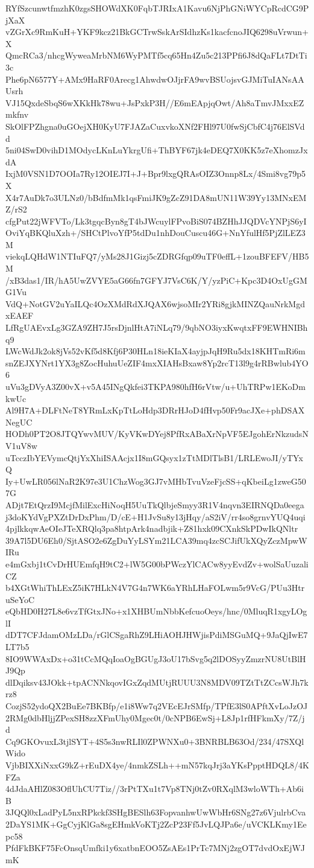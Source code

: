 RYfSzcunwtfmzhK0zgsSHOWdXK0FqbTJRIxA1Kavu6NjPhGNiWYCpRcdCG9PjXaX
vZGrXc9RmKuH+YKF9kcz21BkGCTrwSskArSIdhzKs1kacfcnoJIQ6298uVrwun+X
QmcRCa3/nhcgWyweaMrbNM6WyPMTf5cq65Hn4Zu5c213PPfi6J8dQaFLt7DtTi3c
Phe6pN6577Y+AMx9HaRF0Arecg1AhwdwOJjrFA9wvBSUojsvGJMiTuIANsAAUsrh
VJ15QxdeSbqS6wXKkHk78wu+JsPxkP3H//E6mEApjqOwt/Ah8aTmvJMxxEZmkfnv
SkOlFPZhgna0uGOejXH0KyU7FJAZaCuxvkoXNf2FHl97U0fwSjCbfC4j76ElSVdd
5ni04SwD0vihD1MOdycLKnLuYkrgUfi+ThBYF67jk4eDEQ7X0KK5z7eXhomzJxdA
IxjM0VSN1D7OOIa7Ry12OIEJ7I+J+Bpr9lxgQRAsOIZ3Onnp8Lx/4Smi8vg79p5X
X4r7AuDk7o3ULNz0/bBdfmMk1qsFmiJK9gZcZ91DA8mUN11W39Yy13MNxEMZ/rS2
cfgPut22jWFVTo/Lk3tgqcByn8gT4bJWcuylFPvoBiS074BZHhJJQDVcYNPjS6yI
OviYqBKQluXzh+/SHCtPlvoYfP5tdDu1nhDouCuscu46G+NnYfulHf5PjZlLEZ3M
viekqLQHdW1NTIuFQ7/yMs28J1Gizj5cZDRGfqp09uTF0effL+1zouBFEFV/HB5M
/xB3das1/IR/hA5UwZVYE5aG66fn7GFYJ7VsC6K/Y/yzPiC+Kpc3D4OxUgGMG1Vu
VdQ+NotGV2uYaILQc4OzXMdRdXJQAX6wjsoMIr2YRi8gjkMINZQauNrkMgdxEAEF
LfRgUAEvxLg3GZA9ZH7J5rsDjnlHtA7iNLq79/9qbNO3iyxKwqtxFF9EWHNIBhq9
LWcWdJk2ok8jVs52vKf5d8Kfj6P30HLn18ieKIaX4ayjpJqH9Ru5dx18KHTmRi6m
snZEJXYNrt1YX3g8ZocHuhuUeZIF4mxXIAHsBxaw8Yp2rcT13l9g4rRBwlub4YO6
uVu3gDVyA3Z00vX+v5A45INgQkfei3TKPA980hfH6rVtw/u+UhTRPw1EKoDmkwUc
Al9H7A+DLFtNeT8YRmLxKpTtLoHdp3DRrHJoD4fHvp50Fr9acJXe+phDSAXNegUC
HODh0PT2O8JTQYwvMUV/KyVKwDYej8PfRxABaXrNpVF5EJgohErNkzudsNV1uV8w
uTcczIbYEVymcQtjYxXhiISAAcjx1I8mGQsyx1zTtMDlTlsB1/LRLEwoJI/yTYxQ
Iy+UwLR056lNaR2K97e3U1ChzWog3GJ7vMHbTvuVzeFjcSS+qKbeiLg1zweG507G
ADjt7EtQrzI9McjfMilExcHiNoqH5UuTkQlbjeSmyy3R1V4nqvn3EIRNQDa0eega
j3doKYdVgPXZtDrDxPhm/D/cE+H1JvSu8y13jHqy/aS2iV/rr4so8grnvYUQ4uqi
4pjlkkqwAeOIeJTeXRQlq3pa8htpArk4nadbjik+Z81hxk09CXnkSkPDwIkQNltr
39A7l5DU6Eh0/SjtASO2e6ZgDuYyLSYm21LCA39mq4zcSCJifUkXQyZczMpwWIRu
e4mGxbj1tCvDrHUEmfqH9tC2+lW5G00bPWczYlCACw8yyEvdZv+wolSaUuzaliCZ
b4XGtWhiThLExZ5iK7HLkN4V7G4n7WK6aYRhLHaFOLwm5r9VcG/PUu3HtruSeYoC
eQbHD0H27L8e6vzTfGtxJNo+x1XHBUmNbbKefcuoOeys/hnc/0MluqR1xgyLOglI
dDT7CFJdamOMzLDa/rGlCSgaRhZ9LHiAOHJHWjisPdiMSGuMQ+9JaQjIwE7LT7b5
8IO9WWAxDx+o31tCcMQqIoaOgBGUgJ3oU17bSvg5q2lDOSyyZmzrNU8UtBlHJ9Qp
dlDqiksv43JOkk+tpACNNkqovIGxZqdMUtjRUUU3N8MDV09TZtTtZCcsWJh7krz8
CozjS52ydoQX2BuEe7BKBfp/e1i8Ww7q2VEcEJrSMfp/TPfE3lS0APftXvLoJzOJ
2RMg0dbHljjZPexSH8zzXFmUhy0Mgec0t/0cNPB6EwSj+L8Jp1rfHFkmXy/7Z/jd
Cq9GKOvuxL3tjlSYT+4S5s3nwRLIl0ZPWNXu0+3BNRBLB63Od/234/47SXQlWido
VjbBIXXiNxxG9kZ+rEuDX4ye/4nmkZSLh++mN57kqJrj3aYKsPpptHDQL8/4KFZa
4dJdaAHlZ083OflUhCU7Tiz//3rPtTXu1t7Vp8TNj0tZv0RXqlM3wloWTh+Ab6iB
3JQQl0xLadPyL5nxRPkckf3SHgBESlh63FopvanhwUwWbHr6SNg27z6VjulrbCva
2DaYS1MK+GgCyjKlGa8sgEHmkVoKTj2ZcP23Ff5JvLQJPa6e/uVCKLKmy1Eepc58
PfdFkBKF75FcOnsqUmfki1y6xatbnEOO5ZsAEs1PrTc7MNj2zgOT7dvdOxEjWJmK
